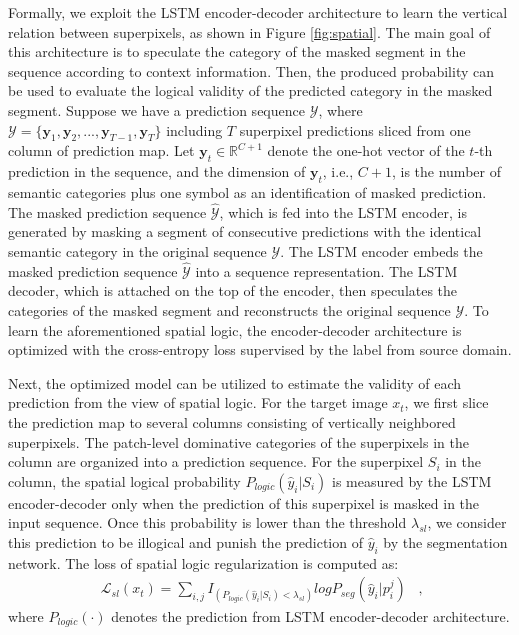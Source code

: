 \documentclass[10pt,twocolumn,letterpaper]{article}
\begin{document}
Formally, we exploit the LSTM encoder-decoder architecture to learn the vertical relation between superpixels, as shown in Figure \ref{fig:spatial}. The main goal of this architecture is to speculate the category of the masked segment in the sequence according to context information. Then, the produced probability can be used to evaluate the logical validity of the predicted category in the masked segment. Suppose we have a prediction sequence $\mathcal{Y}$, where $\mathcal{Y}=\{\mathbf{y}_1,\mathbf{y}_2,...,\mathbf{y}_{T-1},\mathbf{y}_{T}\}$ including $T$ superpixel predictions sliced from one column of prediction map. Let $\mathbf{y}_{t} \in \mathbb{R}^{C+1}$ denote the one-hot vector of the $t$-th prediction in the sequence, and the dimension of $\mathbf{y}_{t}$, i.e., $C+1$, is the number of semantic categories plus one symbol as an identification of masked prediction. The masked prediction sequence $\hat{\mathcal{Y}}$, which is fed into the LSTM encoder, is generated by masking a segment of consecutive predictions with the identical semantic category in the original sequence $\mathcal{Y}$. The LSTM encoder embeds the masked prediction sequence $\hat{\mathcal{Y}}$ into a sequence representation. The LSTM decoder, which is attached on the top of the encoder, then speculates the categories of the masked segment and reconstructs the original sequence $\mathcal{Y}$. To learn the aforementioned spatial logic, the encoder-decoder architecture is optimized with the cross-entropy loss supervised by the label from source domain.

Next, the optimized model can be utilized to estimate the validity of each prediction from the view of spatial logic. For the target image $x_t$, we first slice the prediction map to several columns consisting of vertically neighbored superpixels. The patch-level dominative categories of the superpixels in the column are organized into a prediction sequence. For the superpixel $S_i$ in the column, the spatial logical probability $P_{logic}(\hat{y}_i| S_i)$ is measured by the LSTM encoder-decoder only when the prediction of this superpixel is masked in the input sequence. Once this probability is lower than the threshold $\lambda_{sl}$, we consider this prediction to be illogical and punish the prediction of $\hat{y}_i$ by the segmentation network. The loss of spatial logic regularization is computed as:
\begin{equation}\label{eq:pc}
\begin{aligned}
\mathcal{L}_{sl}(x_t)=\sum_{i, j} I_{(P_{logic}(\hat{y}_i| S_i)<\lambda_{sl})} log P_{seg}(\hat{y}_i| p^j_i)
\end{aligned}~~,
\end{equation}
where $P_{logic}(\cdot)$ denotes the prediction from LSTM encoder-decoder architecture.
\end{document}
